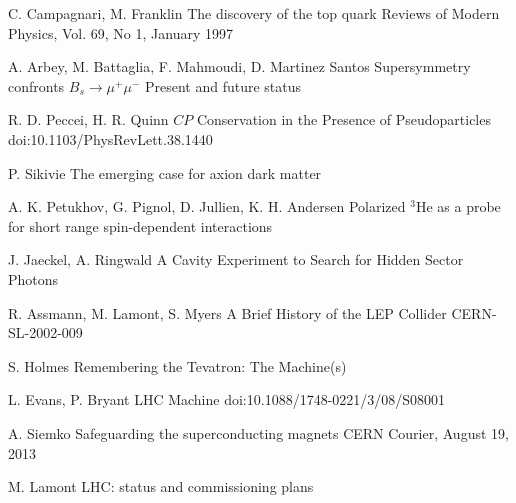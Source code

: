 

\begin{thebibliography}{2}


\singlespace

{C. Campagnari, M. Franklin}
{The discovery of the top quark}
{Reviews of Modern Physics, Vol. 69, No 1, January 1997}

{A. Arbey, M. Battaglia, F. Mahmoudi, D. Martinez Santos}
{Supersymmetry confronts $B_s \rightarrow \mu^+ \mu^-$ Present and future status}
{}

{R. D. Peccei, H. R. Quinn}
{$CP$ Conservation in the Presence of Pseudoparticles}
{doi:10.1103/PhysRevLett.38.1440}

{P. Sikivie}
{The emerging case for axion dark matter}
{}

{A. K. Petukhov, G. Pignol, D. Jullien, K. H. Andersen}
{Polarized $^3$He as a probe for short range spin-dependent interactions}
{}

{J. Jaeckel, A. Ringwald}
{A Cavity Experiment to Search for Hidden Sector Photons}
{}

{R. Assmann, M. Lamont, S. Myers}
{A Brief History of the LEP Collider}
{CERN-SL-2002-009}

{S. Holmes}
{Remembering the Tevatron: The Machine(s)}
{}

{L. Evans, P. Bryant}
{LHC Machine}
{doi:10.1088/1748-0221/3/08/S08001}

{A. Siemko}
{Safeguarding the superconducting magnets}
{CERN Courier, August 19, 2013}

{M. Lamont}
{LHC: status and commissioning plans}
{}





\end{thebibliography}
